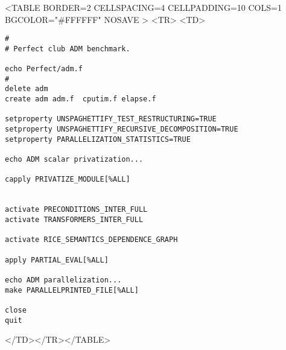 \documentclass[a4paper,12pt]{article}
\begin{document}
\begin{rawhtml}
<TABLE BORDER=2 CELLSPACING=4 CELLPADDING=10 COLS=1  BGCOLOR="#FFFFFF" NOSAVE >
<TR>
<TD>
\end{rawhtml}
{\bf
\begin{verbatim}
#
# Perfect club ADM benchmark.

echo Perfect/adm.f
#
delete adm
create adm adm.f  cputim.f elapse.f 

setproperty UNSPAGHETTIFY_TEST_RESTRUCTURING=TRUE
setproperty UNSPAGHETTIFY_RECURSIVE_DECOMPOSITION=TRUE
setproperty PARALLELIZATION_STATISTICS=TRUE

echo ADM scalar privatization...
 
capply PRIVATIZE_MODULE[%ALL]


activate PRECONDITIONS_INTER_FULL
activate TRANSFORMERS_INTER_FULL

activate RICE_SEMANTICS_DEPENDENCE_GRAPH

apply PARTIAL_EVAL[%ALL]

echo ADM parallelization...
make PARALLELPRINTED_FILE[%ALL]

close
quit
\end{verbatim}
}
\begin{rawhtml}
</TD></TR></TABLE>
\end{rawhtml}
\end{document}
